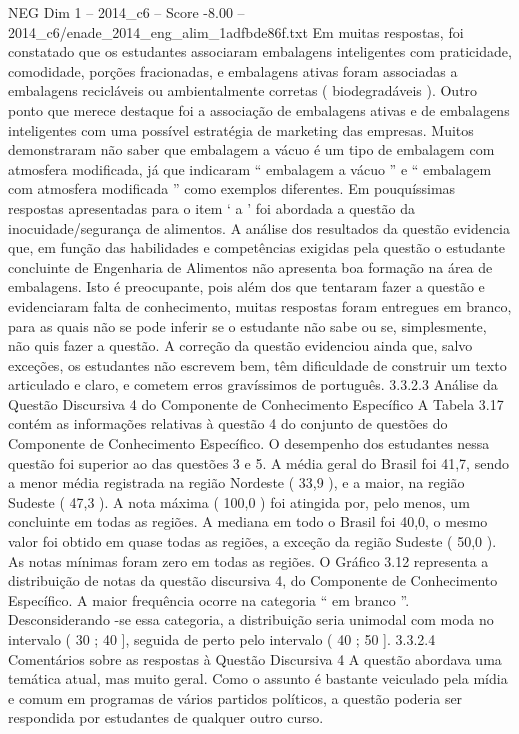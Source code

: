 \begin{textsample}{NEG Dim 1 – 2014\_c6 – Score -8.00 – 2014\_c6/enade\_2014\_eng\_alim\_1adfbde86f.txt}
Em muitas respostas, foi constatado que os estudantes associaram embalagens inteligentes com praticidade, comodidade, porções fracionadas, e embalagens ativas foram associadas a embalagens recicláveis ou ambientalmente corretas ( biodegradáveis ).
Outro ponto que merece destaque foi a associação de embalagens ativas e de embalagens inteligentes com uma possível estratégia de marketing das empresas.
Muitos demonstraram não saber que embalagem a vácuo é um tipo de embalagem com atmosfera modificada, já que indicaram “ embalagem a vácuo ” e “ embalagem com atmosfera modificada ” como exemplos diferentes.
Em pouquíssimas respostas apresentadas para o item ‘ a ’ foi abordada a questão da inocuidade/segurança de alimentos.
A análise dos resultados da questão evidencia que, em função das habilidades e competências exigidas pela questão o estudante concluinte de Engenharia de Alimentos não apresenta boa formação na área de embalagens.
Isto é preocupante, pois além dos que tentaram fazer a questão e evidenciaram falta de conhecimento, muitas respostas foram entregues em branco, para as quais não se pode inferir se o estudante não sabe ou se, simplesmente, não quis fazer a questão.
A correção da questão evidenciou ainda que, salvo exceções, os estudantes não escrevem bem, têm dificuldade de construir um texto articulado e claro, e cometem erros gravíssimos de português. 3.3.2.3 Análise da Questão Discursiva 4 do Componente de Conhecimento Específico A Tabela 3.17 contém as informações relativas à questão 4 do conjunto de questões do Componente de Conhecimento Específico.
O desempenho dos estudantes nessa questão foi superior ao das questões 3 e 5.
A média geral do Brasil foi 41,7, sendo a menor média registrada na região Nordeste ( 33,9 ), e a maior, na região Sudeste ( 47,3 ).
A nota máxima ( 100,0 ) foi atingida por, pelo menos, um concluinte em todas as regiões.
A mediana em todo o Brasil foi 40,0, o mesmo valor foi obtido em quase todas as regiões, a exceção da região Sudeste ( 50,0 ).
As notas mínimas foram zero em todas as regiões.
O Gráfico 3.12 representa a distribuição de notas da questão discursiva 4, do Componente de Conhecimento Específico.
A maior frequência ocorre na categoria “ em branco ”.
Desconsiderando -se essa categoria, a distribuição seria unimodal com moda no intervalo ( 30 ; 40 ], seguida de perto pelo intervalo ( 40 ; 50 ]. 3.3.2.4 Comentários sobre as respostas à Questão Discursiva 4 A questão abordava uma temática atual, mas muito geral.
Como o assunto é bastante veiculado pela mídia e comum em programas de vários partidos políticos, a questão poderia ser respondida por estudantes de qualquer outro curso.

\end{textsample}
